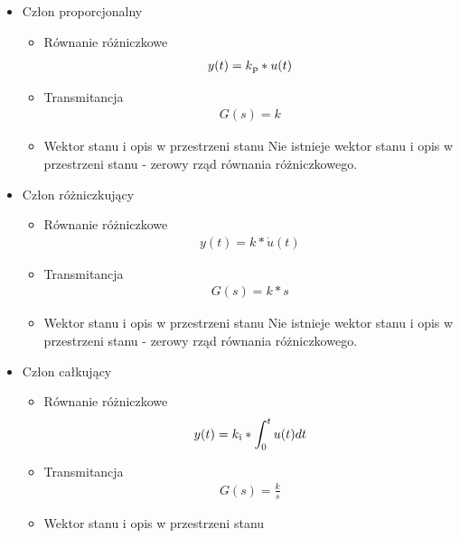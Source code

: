 \documentclass[a4paper,10pt]{article}
\begin{document}
\begin{itemize}
	
\item Człon proporcjonalny
\begin{itemize}
	\item Równanie różniczkowe
	\begin{eqnarray} 
	 y(t) = k\textsubscript p * u(t)
	\end{eqnarray}
	\item Transmitancja	
	\begin{eqnarray}
	G(s) = k
	\end{eqnarray}
	\item Wektor stanu i opis w przestrzeni stanu
	\newline Nie istnieje wektor stanu i opis w przestrzeni stanu - zerowy rząd równania różniczkowego.
\end{itemize}
	
	
\item Człon różniczkujący
	\begin{itemize}
		\item Równanie różniczkowe
		\begin{eqnarray}
 		y(t) = k * \dot{u}(t)
		\end{eqnarray}
		\item Transmitancja
		\begin{eqnarray}
		G(s) = k*s
		\end{eqnarray}
		\item Wektor stanu i opis w przestrzeni stanu
		\newline Nie istnieje wektor stanu i opis w przestrzeni stanu - zerowy rząd równania różniczkowego.
	\end{itemize}
	
	
\item Człon całkujący

\begin{itemize}
	\item Równanie różniczkowe
	\begin{eqnarray} 
	y(t) = k\textsubscript i * \int_{0}^{t} u(t)dt
	\end{eqnarray}	
	\item Transmitancja	
	\begin{eqnarray}
	G(s) = \frac{k}{s}
	\end{eqnarray}

	\item Wektor stanu i opis w przestrzeni stanu


\end{itemize}
\end{itemize}
\end{document}
